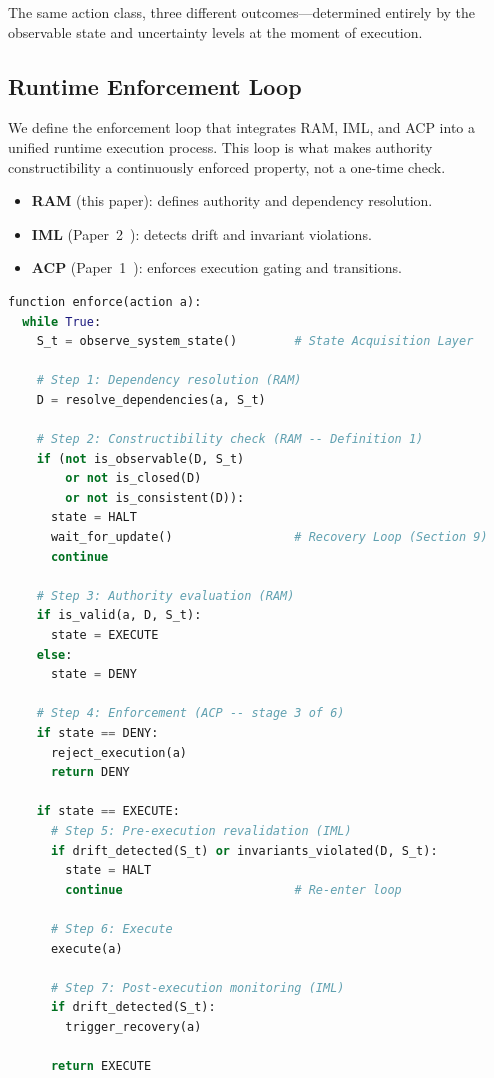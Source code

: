 \documentclass[11pt]{article}
\begin{document}
The same action class, three different outcomes---determined entirely by the
observable state and uncertainty levels at the moment of execution.

\subsection{Runtime Enforcement Loop}
\label{sec:enforcement-loop}

We define the enforcement loop that integrates RAM, IML, and ACP into a unified
runtime execution process. This loop is what makes authority constructibility a
continuously enforced property, not a one-time check.

\begin{itemize}
  \item \textbf{RAM} (this paper): defines authority and dependency resolution.
  \item \textbf{IML} (Paper~2~\cite{fernandez2026c}): detects drift and invariant violations.
  \item \textbf{ACP} (Paper~1~\cite{fernandez2026b}): enforces execution gating and transitions.
\end{itemize}

\begin{lstlisting}[language=Python, caption={Runtime enforcement loop integrating RAM, IML, and ACP}]
function enforce(action a):
  while True:
    S_t = observe_system_state()        # State Acquisition Layer

    # Step 1: Dependency resolution (RAM)
    D = resolve_dependencies(a, S_t)

    # Step 2: Constructibility check (RAM -- Definition 1)
    if (not is_observable(D, S_t)
        or not is_closed(D)
        or not is_consistent(D)):
      state = HALT
      wait_for_update()                 # Recovery Loop (Section 9)
      continue

    # Step 3: Authority evaluation (RAM)
    if is_valid(a, D, S_t):
      state = EXECUTE
    else:
      state = DENY

    # Step 4: Enforcement (ACP -- stage 3 of 6)
    if state == DENY:
      reject_execution(a)
      return DENY

    if state == EXECUTE:
      # Step 5: Pre-execution revalidation (IML)
      if drift_detected(S_t) or invariants_violated(D, S_t):
        state = HALT
        continue                        # Re-enter loop

      # Step 6: Execute
      execute(a)

      # Step 7: Post-execution monitoring (IML)
      if drift_detected(S_t):
        trigger_recovery(a)

      return EXECUTE
\end{lstlisting}
\end{document}
